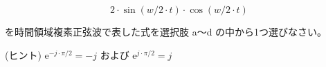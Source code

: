 \[
2 \cdot \sin(w/2 \cdot t) \cdot \cos(w/2 \cdot t)
\]

\bigskip
\noindent を時間領域複素正弦波で表した式を選択肢 a〜d の中から1つ選びなさい。

\noindent (ヒント) $\textrm{e}^{-j \cdot \pi/2} = -j$ および $\textrm{e}^{j \cdot \pi/2} = j$
